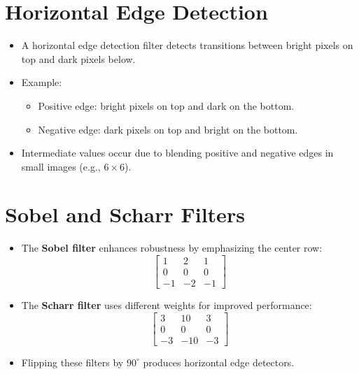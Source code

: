 \documentclass[letterpaper,12pt,notitlepage,twoside]{report}
\begin{document}
\section{Horizontal Edge Detection}
\begin{itemize}
    \item A horizontal edge detection filter detects transitions between bright pixels on top and dark pixels below.
    \item Example:
    \begin{itemize}
        \item Positive edge: bright pixels on top and dark on the bottom.
        \item Negative edge: dark pixels on top and bright on the bottom.
    \end{itemize}
    \item Intermediate values occur due to blending positive and negative edges in small images (e.g., $6 \times 6$).
\end{itemize}

\section{Sobel and Scharr Filters}
\begin{itemize}
    \item The \textbf{Sobel filter} enhances robustness by emphasizing the center row:
    \[
    \begin{bmatrix}
    1 & 2 & 1 \\
    0 & 0 & 0 \\
    -1 & -2 & -1
    \end{bmatrix}
    \]
    \item The \textbf{Scharr filter} uses different weights for improved performance:
    \[
    \begin{bmatrix}
    3 & 10 & 3 \\
    0 & 0 & 0 \\
    -3 & -10 & -3
    \end{bmatrix}
    \]
    \item Flipping these filters by $90^\circ$ produces horizontal edge detectors.
\end{itemize}
\end{document}
